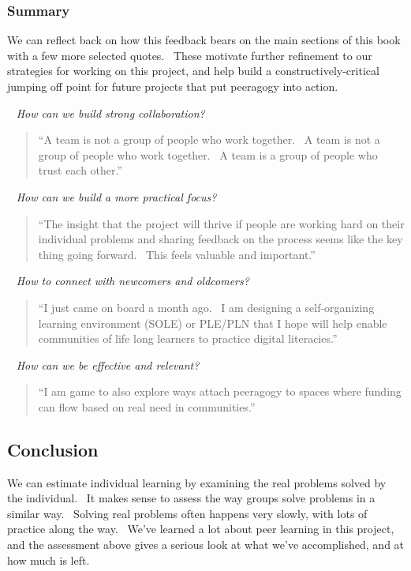 \subsubsection{Summary}\label{summary}

We can reflect back on how this feedback bears on the main sections of
this book with a few more selected quotes.~ These motivate further
refinement to our strategies for working on this project, and help build
a constructively-critical jumping off point for future projects that put
peeragogy into action.

~ \emph{How can we build strong collaboration?}

\begin{quote}
``A team is not a group of people who work together.~ A team is not a
group of people who work together.~ A team is a group of people who
trust each other.''
\end{quote}

~ \emph{How can we build a more practical focus?}

\begin{quote}
``The insight that the project will thrive if people are working hard on
their individual problems and sharing feedback on the process seems like
the key thing going forward.~ This feels valuable and important.''
\end{quote}

~ \emph{How to connect with newcomers and oldcomers?}

\begin{quote}
``I just came on board a month ago.~ I am designing a self-organizing
learning environment (SOLE) or PLE/PLN that I hope will help enable
communities of life long learners to practice digital literacies.''
\end{quote}

~ \emph{How can we be effective and relevant?}

\begin{quote}
``I am game to also explore ways attach peeragogy to spaces where
funding can flow based on real need in communities.''
\end{quote}

\subsection{Conclusion}\label{assessment-conclusion}

We can estimate individual learning by examining the real problems
solved by the individual.~ It makes sense to assess the way groups solve
problems in a similar way.~ Solving real problems often happens very
slowly, with lots of practice along the way.~ We've learned a lot about
peer learning in this project, and the assessment above gives a serious
look at what we've accomplished, and at how much is left.
